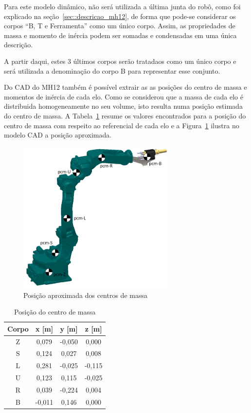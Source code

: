 Para este modelo dinâmico, não será utilizada a última junta do robô, como foi
explicado na seção~\ref{sec::descricao_mh12}, de forma que pode-se considerar os
corpos ``B, T e Ferramenta'' como um único corpo. Assim, as propriedades de
massa e momento de inércia podem ser somadas e condensadas em uma única
descrição. 

A partir daqui, estes 3 últimos corpos serão tratadaos como um único corpo e
será utilizada a denominação do corpo B para representar esse conjunto.

Do CAD do MH12 também é possível extrair as as posições do centro de massa e
momentos de inércia de cada elo.
Como se considerou que a massa de cada elo é distribuida homogeneamente no seu
volume, isto resulta numa posição estimada do centro de massa. A
Tabela~\ref{tab::resumo_cm} resume os valores encontrados para a posição do
centro de massa com respeito ao referencial de cada elo e a
Figura~\ref{fig::pcm_mh12} ilustra no modelo CAD a posição aproximada.

\begin{figure}[h]
	\centering 
 	\includegraphics[width=0.7\textwidth]{figs/pcm_mh12}
 	\caption{Posição aproximada dos centros de massa}
 	\label{fig::pcm_mh12}
\end{figure}

%
\begin{table}[h] \centering
\caption{Posição do centro de massa}
\label{tab::resumo_cm}
\begin{tabular}{@{}cccc@{}}
\toprule
\textbf{Corpo} & \textbf{x [m]} & \textbf{y [m]} & \textbf{z [m]} \\ \midrule
Z              & 0,079      & -0,050     & 0,000      \\
S              & 0,124      & 0,027      & 0,008      \\
L              & 0,281      & -0,025     & -0,115     \\
U              & 0,123      & 0,115      & -0,025     \\
R              & 0,039      & -0,224     & 0,004      \\
B              & -0,011     & 0,146      & 0,000      \\ \bottomrule
\end{tabular}
\end{table}
%

